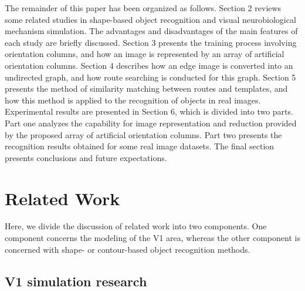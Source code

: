 \documentclass{article}
\begin{document}
The remainder of this paper has been organized as follows. 
Section 2 reviews some related studies in shape-based object recognition and visual neurobiological mechanism simulation. 
The advantages and disadvantages of the main features of each study are briefly discussed. 
Section 3 presents the training process involving orientation columns, 
and how an image is represented by an array of artificial orientation columns. 
Section 4 describes how an edge image is converted into an undirected graph, 
and how route searching is conducted for this graph. 
Section 5 presents the method of similarity matching between routes and templates, 
and how this method is applied to the recognition of objects in real images. 
Experimental results are presented in Section 6, which is divided into two parts. 
Part one analyzes the capability for image representation and reduction provided by the proposed array of artificial orientation columns. 
Part two presents the recognition results obtained for some real image datasets. 
The final section presents conclusions and future expectations.

\section{Related Work}

Here, we divide the discussion of related work into two components. 
One component concerns the modeling of the V1 area, 
whereas the other component is concerned with shape- or contour-based object recognition methods. 

\subsection{V1 simulation research}
\end{document}
